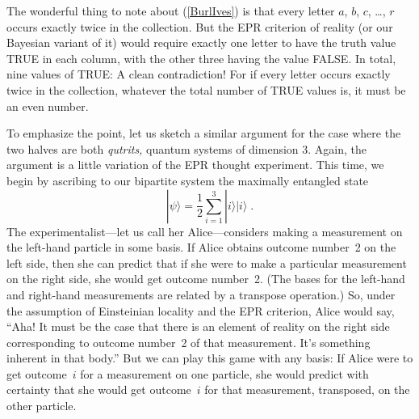 \documentclass[aps,pra,superscriptaddress,12pt,tightenlines,nofootinbib]{revtex4-2}
\begin{document}
The wonderful thing to note about (\ref{BurlIves}) is that every letter $a$, $b$, $c$, \ldots, $r$ occurs exactly twice in the collection.  But the EPR criterion of reality (or our Bayesian variant of it) would require exactly one letter to have the truth value TRUE in each column, with the other three having the value FALSE.  In total, nine values of TRUE:  A clean contradiction!  For if every letter occurs exactly twice in the collection, whatever the total number of TRUE values is, it must be an even number.

To emphasize the point, let us sketch a similar argument for the case where the two halves are both {\it qutrits,} quantum systems of dimension 3.  Again, the argument is a little variation of the EPR thought experiment.  This time, we begin by ascribing to our bipartite system the maximally entangled state
\begin{equation}
|\psi\rangle=\frac{1}{2}\sum_{i=1}^3|i\rangle|i\rangle\;.
\end{equation}
The experimentalist---let us call her Alice---considers making a
measurement on the left-hand particle in some basis.  If Alice obtains
outcome number~2 on the left side, then she can predict that if she
were to make a particular measurement on the right side, she would get
outcome number~2.  (The bases for the left-hand and right-hand
measurements are related by a transpose operation.)  So, under the
assumption of Einsteinian locality and the EPR criterion, Alice would
say, ``Aha!  It must be the case that there is an element of reality
on the right side corresponding to outcome number~2 of that
measurement.  It's something inherent in that body.''  But we can play
this game with any basis: If Alice were to get outcome~$i$ for a
measurement on one particle, she would predict with certainty that she
would get outcome~$i$ for that measurement, transposed, on the other
particle.
\end{document}
